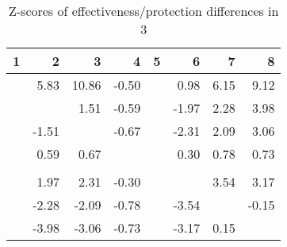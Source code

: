 \begin{table}[ht]
\centering
\begin{tabular}{rrrrrrrr}
  \hline
1 & 2 & 3 & 4 & 5 & 6 & 7 & 8 \\ 
  \hline
 & 5.83 & 10.86 & -0.50 &  & 0.98 & 6.15 & 9.12 \\ 
   &  & 1.51 & -0.59 &  & -1.97 & 2.28 & 3.98 \\ 
   & -1.51 &  & -0.67 &  & -2.31 & 2.09 & 3.06 \\ 
   & 0.59 & 0.67 &  &  & 0.30 & 0.78 & 0.73 \\ 
   &  &  &  &  &  &  &  \\ 
   & 1.97 & 2.31 & -0.30 &  &  & 3.54 & 3.17 \\ 
   & -2.28 & -2.09 & -0.78 &  & -3.54 &  & -0.15 \\ 
   & -3.98 & -3.06 & -0.73 &  & -3.17 & 0.15 &  \\ 
   \hline
\end{tabular}
\caption{Z-scores of effectiveness/protection differences in  3} 
\end{table}
